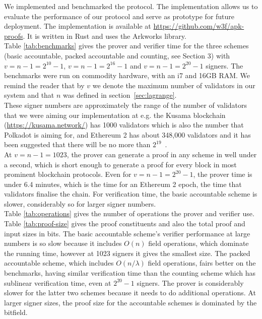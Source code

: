 
\noindent We implemented and benchmarked the protocol. The implementation allows us to evaluate the performance of our protocol and serve as prototype for future deployment. The implementation is available at \url{https://github.com/w3f/apk-proofs}. It is written in Rust and uses the Arkworks library. \\

\noindent Table \ref{tab:benchmarks} gives the prover and verifier time for the three schemes (basic accountable, packed accountable and counting, see Section 3) with $v = n-1 = 2^{10}-1$, $v = n-1 = 2^{16}-1$ 
and $v=n-1=2^{20}-1$ signers. The benchmarks were run on commodity hardware, with an i7 and 16GB RAM. We remind the reader that by $v$ we denote the maximum number of  validators in our system and that $n$ was defined in section~\ref{sec:lagrange}.\\

\noindent These signer numbers are approximately the range of the number of validators that we were aiming our implementation at e.g. the Kusama blockchain (\url{https://kusama.network/}) has 1000 validators which is also the number that Polkadot is aiming for, and Ethereum 2 has about 348,000 validators and it has been suggested that there will be no more than $2^{19}$~\cite{ethresearch1}. \\

\noindent At $v = n-1 = 1023$, the prover can generate a proof in any scheme in well under a second, which is short enough to generate a proof for every block in most prominent blockchain protocols. Even for $v= n-1 =2^{20}-1$, the prover time is under 6.4 minutes, which is the time for an Ethereum 2 epoch, the time that validators finalise the chain. For verification time, the basic accountable scheme is slower, considerably so for larger signer numbers. \\

\noindent  Table \ref{tab:operations} gives the number of operations the prover and verifier use. Table \ref{tab:proof-size} gives the proof constituents and also the total proof and input sizes in bits. The basic accountable scheme's verifier performance at large numbers is so slow because it includes $O(n)$ field operations, which dominate the running time, however at 1023 signers it gives the smallest size. The packed accountable scheme, which includes $O(n/\lambda)$ field operations, fairs better on the benchmarks, having similar verification time than the counting scheme which has sublinear verification time, even at $2^{20}-1$ signers. The prover is considerably slower for the latter two schemes because it needs to do additional operations. At larger signer sizes, the proof size for the accountable schemes is dominated by the bitfield.

